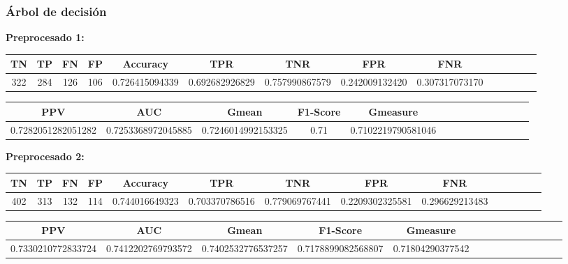 \documentclass[a4]{article}
\begin{document}
\subsubsection{Árbol de decisión}

\textbf{Preprocesado 1:}
\begin{center}
\begin{tabular}{|c|c|c|c|c|c|c|c|c|c|c|c|c|c|}
\hline
\multicolumn{1}{|c|}{\textbf{TN}}& \textbf{TP} & \textbf{FN} & \textbf{FP} & \textbf{Accuracy} & \textbf{TPR} & \textbf{TNR} & \textbf{FPR} &\textbf{FNR} \\ \hline
  322 & 284 & 126 & 106 & 0.726415094339 & 0.692682926829 & 0.757990867579 & 0.242009132420 & 0.307317073170 \\ \hline
\end{tabular}
\end{center}

\begin{center}
\begin{tabular}{|c|c|c|c|c|c|c|c|c|c|c|c|c|c|}
\hline
\multicolumn{1}{|c|}{\textbf{PPV}} & \textbf{AUC} & \textbf{Gmean} & \textbf{F1-Score} & \textbf{Gmeasure}  \\ \hline
  0.7282051282051282 & 0.7253368972045885 & 0.7246014992153325 & 0.71 & 0.7102219790581046 \\ \hline
\end{tabular}
\end{center}

\textbf{Preprocesado 2:}
\begin{center}
\begin{tabular}{|c|c|c|c|c|c|c|c|c|c|c|c|c|c|}
\hline
\multicolumn{1}{|c|}{\textbf{TN}}& \textbf{TP} & \textbf{FN} & \textbf{FP} & \textbf{Accuracy} & \textbf{TPR} & \textbf{TNR} & \textbf{FPR} &\textbf{FNR} \\ \hline
  402 & 313 & 132 & 114 & 0.744016649323 & 0.703370786516 & 0.779069767441 & 0.2209302325581 & 0.296629213483 \\ \hline
\end{tabular}
\end{center}

\begin{center}
\begin{tabular}{|c|c|c|c|c|c|c|c|c|c|c|c|c|c|}
\hline
\multicolumn{1}{|c|}{\textbf{PPV}} & \textbf{AUC} & \textbf{Gmean} & \textbf{F1-Score} & \textbf{Gmeasure}  \\ \hline
  0.7330210772833724 & 0.7412202769793572 & 0.7402532776537257 & 0.7178899082568807 & 0.71804290377542 \\ \hline
\end{tabular}
\end{center}
\end{document}
